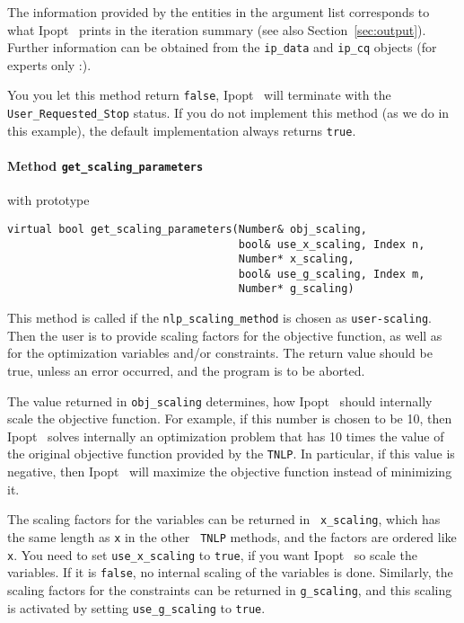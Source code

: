 \documentclass[10pt]{article}
\newcommand{\Ipopt}{{\sc Ipopt }}
\begin{document}
The information provided by the entities in the argument list
corresponds to what \Ipopt\ prints in the iteration summary (see also
Section~\ref{sec:output}).  Further information can be obtained from
the {\tt ip\_data} and {\tt ip\_cq} objects (for experts only :).

You you let this method return {\tt false}, \Ipopt\ will terminate
with the {\tt User\_Requested\_Stop} status.  If you do not implement
this method (as we do in this example), the default implementation
always returns {\tt true}.

\paragraph{Method \texttt{get\_scaling\_parameters}} with prototype
\begin{verbatim}
virtual bool get_scaling_parameters(Number& obj_scaling,
                                    bool& use_x_scaling, Index n,
                                    Number* x_scaling,
                                    bool& use_g_scaling, Index m,
                                    Number* g_scaling)
\end{verbatim}

This method is called if the {\tt nlp\_scaling\_method} is chosen as
{\tt user-scaling}.  Then the user is to provide scaling factors for
the objective function, as well as for the optimization variables
and/or constraints.  The return value should be true, unless an error
occurred, and the program is to be aborted.

The value returned in {\tt obj\_scaling} determines, how \Ipopt\
should internally scale the objective function.  For example, if this
number is chosen to be 10, then \Ipopt\ solves internally an
optimization problem that has 10 times the value of the original
objective function provided by the {\tt TNLP}.  In particular, if this
value is negative, then \Ipopt\ will maximize the objective function
instead of minimizing it.

The scaling factors for the variables can be returned in {\tt
  x\_scaling}, which has the same length as {\tt x} in the other {\tt
  TNLP} methods, and the factors are ordered like {\tt x}.  You need
to set {\tt use\_x\_scaling} to {\tt true}, if you want \Ipopt\ so scale
the variables.  If it is {\tt false}, no internal scaling of the
variables is done.  Similarly, the scaling factors for the constraints
can be returned in {\tt g\_scaling}, and this scaling is activated by
setting {\tt use\_g\_scaling} to {\tt true}.
\end{document}
